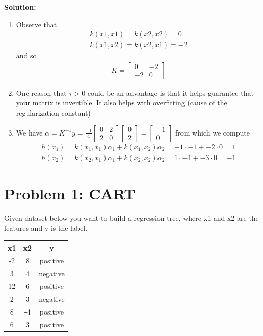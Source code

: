 \documentclass[11pt]{article}
\begin{document}
\textbf{Solution:}
\begin{enumerate}
    \item Observe that \begin{align*}
        k(x1,x1) = k(x2,x2) = 0 \\
        k(x1,x2) = k(x2,x1) = -2
    \end{align*} and so\begin{align*}
        K = \begin{bmatrix}
            0 & -2 \\
            -2 & 0
        \end{bmatrix}
    \end{align*}
    \item One reason that $\tau > 0$ could be an advantage is that 
    it helps guarantee that your matrix is invertible.
    It also helps with overfitting (cause of the regularization constant)
    \item We have $\alpha = K^{-1}y = \frac{-1}{4}\begin{bmatrix}
        0 & 2 \\
        2 & 0
    \end{bmatrix}\begin{bmatrix}
        0\\
        2
    \end{bmatrix} = \begin{bmatrix}
        -1 \\
        0
    \end{bmatrix}$ from which we compute 
    \begin{align*}
        h(x_1) = k(x_1,x_1)\alpha_1 + k(x_1,x_2)\alpha_2 = -1\cdot -1 + -2\cdot 0 = 1 \\
        h(x_2) = k(x_2,x_1)\alpha_1 + k(x_2,x_2)\alpha_2 = 1\cdot -1 + -3\cdot 0 = -1
    \end{align*}
\end{enumerate}



\newpage
\section*{Problem 1: CART}

Given dataset below you want to build a regression tree, where x1 and x2 are the features and y is the label.
	\\
	\begin{center}
	\begin{tabular}{ |c|c|c| } 
    \hline
    x1 & x2 & y \\
    \hline
    -2 & 8 & positive \\ 
    3 & 4 & negative \\ 
    12 & 6 & positive \\ 
    2 & 3 & negative \\ 
    8 & -4 & positive \\ 
    6 & 3 & positive \\ 
    \hline
    \end{tabular}
    \end{center}
\end{document}
